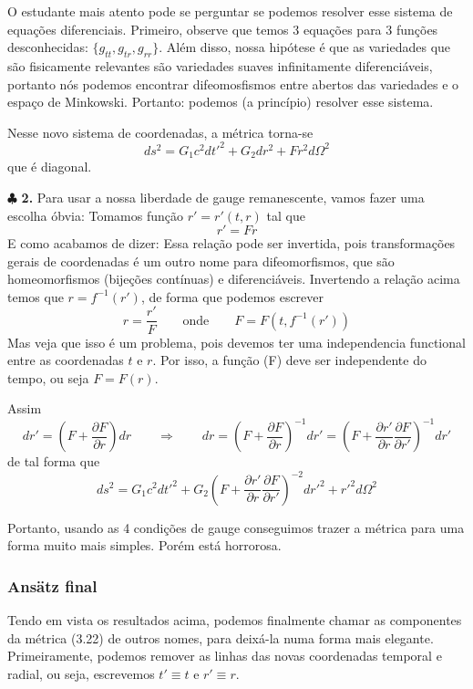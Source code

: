\documentclass[11pt]{article}
\begin{document}
O estudante mais atento pode se perguntar se podemos resolver esse
sistema de equações diferenciais. Primeiro, observe que temos 3 equações
para 3 funções desconhecidas: \(\{g_{tt}, g_{tr}, g_{rr}\}\). Além
disso, nossa hipótese é que as variedades que são fisicamente relevantes
são variedades suaves infinitamente diferenciáveis, portanto nós podemos
encontrar difeomosfismos entre abertos das variedades e o espaço de
Minkowski. Portanto: podemos (a princípio) resolver esse sistema.

Nesse novo sistema de coordenadas, a métrica torna-se
\[ \tag{3.19} ds^2 = G_1 c^2 dt'^2 + G_2 dr^2 + F r^2 d \Omega^2  \] que
é diagonal.

    \(\clubsuit\) \textbf{2.} Para usar a nossa liberdade de gauge
remanescente, vamos fazer uma escolha óbvia: Tomamos função
\(r'=r'(t,r)\) tal que \[ \tag{3.20} r' = F r\] E como acabamos de
dizer: Essa relação pode ser invertida, pois transformações gerais de
coordenadas é um outro nome para difeomorfismos, que são homeomorfismos
(bijeções contínuas) e diferenciáveis. Invertendo a relação acima temos
que \(r = f^{-1}(r')\), de forma que podemos escrever
\[\tag{3.21.a} r = \frac{r'}{F}\qquad \text{onde} \qquad F = F(t, f^{-1}(r')) \]
Mas veja que isso é um problema, pois devemos ter uma independencia
functional entre as coordenadas \(t\) e \(r\). Por isso, a função (F)
deve ser independente do tempo, ou seja \(F = F(r)\).

Assim
\[ \tag{3.21.b} dr' = \left(F + \frac{\partial F}{\partial r} \right) dr \qquad \Rightarrow \qquad dr = \left(F + \frac{\partial F}{\partial r} \right)^{-1} dr' = \left(F + \frac{\partial r'}{\partial r}\frac{\partial F}{\partial r'} \right)^{-1} dr'\]
de tal forma que
\[ \tag{3.22} ds^2 = G_1 c^2 dt'^2 + G_2 \left(F + \frac{\partial r'}{\partial r} \frac{\partial F}{\partial r'} \right)^{-2} dr'^2 + r'^2 d \Omega^2  \]

Portanto, usando as 4 condições de gauge conseguimos trazer a métrica
para uma forma muito mais simples. Porém está horrorosa.

    \hypertarget{ansuxe4tz-final}{%
\subsubsection{Ansätz final}\label{ansuxe4tz-final}}

    Tendo em vista os resultados acima, podemos finalmente chamar as
componentes da métrica (3.22) de outros nomes, para deixá-la numa forma
mais elegante. Primeiramente, podemos remover as linhas das novas
coordenadas temporal e radial, ou seja, escrevemos \(t' \equiv t\) e
\(r' \equiv r\).
\end{document}
